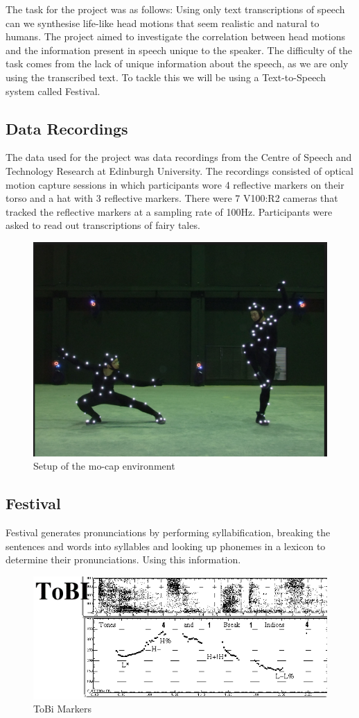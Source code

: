 \documentclass[bsc,frontabs,twoside,singlespacing,parskip]{infthesis}
\begin{document}
The task for the project was as follows: Using only text transcriptions of speech can we synthesise life-like head motions that seem realistic and natural to humans. The project aimed to investigate the correlation between head motions and the information present in speech unique to the speaker. The difficulty of the task comes from the lack of unique information about the speech, as we are only using the transcribed text. To tackle this we will be using a Text-to-Speech system called Festival.

\subsection{Data Recordings}

The data used for the project was data recordings from the Centre of Speech and Technology Research at Edinburgh University. The recordings consisted of optical motion capture sessions in which participants wore 4 reflective markers on their torso and a hat with 3 reflective markers. There were 7 V100:R2 cameras that tracked the reflective markers at a sampling rate of 100Hz. Participants were asked to read out transcriptions of fairy tales.

\begin{figure}[h!]
	\caption{Setup of the mo-cap environment}
	\centering
	\includegraphics[width=.5\textwidth]{mocap.png}
\end{figure}

\subsection{Festival}
Festival generates pronunciations by performing syllabification, breaking the sentences and words into syllables and looking up phonemes in a lexicon to determine their pronunciations. Using this information.

\begin{figure}[h!]
	\caption{ToBi Markers}
	\centering
	\includegraphics[width=1\textwidth]{tobi.png}
\end{figure}
\end{document}
